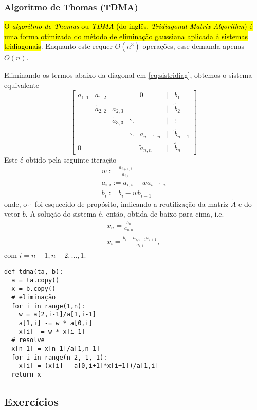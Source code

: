 \subsubsection{Algoritmo de Thomas (TDMA)}

\hl{O \emph{algoritmo de Thomas}{\thomas} ou \emph{TDMA} (do inglês, \textit{Tridiagonal Matrix Algorithm}) é uma forma otimizada do método de eliminação gaussiana{\gauss} aplicada à sistemas tridiagonais}. Enquanto este requer $O(n^3)$ operações, esse demanda apenas $O(n)$.

Eliminando os termos abaixo da diagonal em \eqref{eq:sistridiag}, obtemos o sistema equivalente
\begin{equation}
  \begin{bmatrix}
    a_{1,1} & a_{1,2} & & & 0 & | & b_1\\
      & \tilde{a}_{2,2} & a_{2,3} & & & | & \tilde{b}_2\\
    &  & \tilde{a}_{3,3} & \ddots & & | & \vdots \\
    & & & \ddots & a_{n-1,n} & | & \tilde{b}_{n-1}\\
    0 & & & & \tilde{a}_{n,n} & | & \tilde{b}_n
  \end{bmatrix}
\end{equation}
Este é obtido pela seguinte iteração
\begin{gather}
  w := \frac{a_{i+1,i}}{a_{i,i}}\\
  a_{i,i} := a_{i,i} - w a_{i-1,i}\\
  b_i := b_i - w b_{i-1}
\end{gather}
onde, o $~\tilde{}~$ foi esquecido de propósito, indicando a reutilização da matriz $\tilde{A}$ e do vetor $b$. A solução do sistema é, então, obtida de baixo para cima, i.e.
\begin{gather}
  x_n = \frac{b_n}{a_{n,n}}\\
  x_i = \frac{b_i - a_{i,i+1}x_{i+1}}{a_{i,i}},
\end{gather}
com $i=n-1,n-2,\dotsc,1$.

\begin{lstlisting}[caption=tdma.py, label={py:tdma}]
def tdma(ta, b):
  a = ta.copy()
  x = b.copy()
  # eliminação
  for i in range(1,n):
    w = a[2,i-1]/a[1,i-1]
    a[1,i] -= w * a[0,i]
    x[i] -= w * x[i-1]
  # resolve
  x[n-1] = x[n-1]/a[1,n-1]
  for i in range(n-2,-1,-1):
    x[i] = (x[i] - a[0,i+1]*x[i+1])/a[1,i]
  return x
\end{lstlisting}

\subsection{Exercícios}


